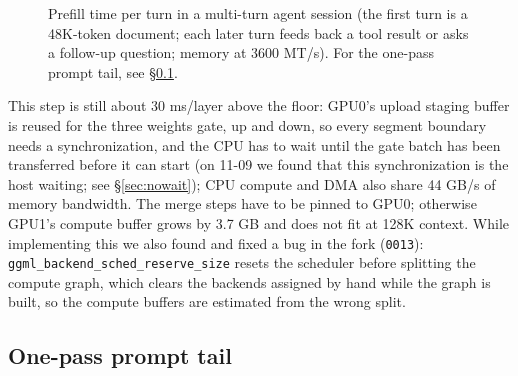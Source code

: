\documentclass[11pt,a4paper]{article}
\newcommand{\code}[1]{\texttt{#1}}
\begin{document}
\begin{figure}[t]
  \centering
  \caption{Prefill time per turn in a multi-turn agent session (the first turn is a 48K-token document; each later turn feeds back a tool result or asks a follow-up question; memory at 3600 MT/s). For the one-pass prompt tail, see \S\ref{sec:tailmerge}.}
  \label{fig:agent}
\end{figure}

This step is still about 30 ms/layer above the floor: GPU0's upload staging buffer is reused for the three weights gate, up and down, so every segment boundary needs a synchronization, and the CPU has to wait until the gate batch has been transferred before it can start (on 11-09 we found that this synchronization is the host waiting; see \S\ref{sec:nowait}); CPU compute and DMA also share 44 GB/s of memory bandwidth. The merge steps have to be pinned to GPU0; otherwise GPU1's compute buffer grows by 3.7 GB and does not fit at 128K context. While implementing this we also found and fixed a bug in the fork (\code{0013}): \code{ggml\_backend\_sched\_reserve\_size} resets the scheduler before splitting the compute graph, which clears the backends assigned by hand while the graph is built, so the compute buffers are estimated from the wrong split.

\subsection{One-pass prompt tail}
\label{sec:tailmerge}
\end{document}
